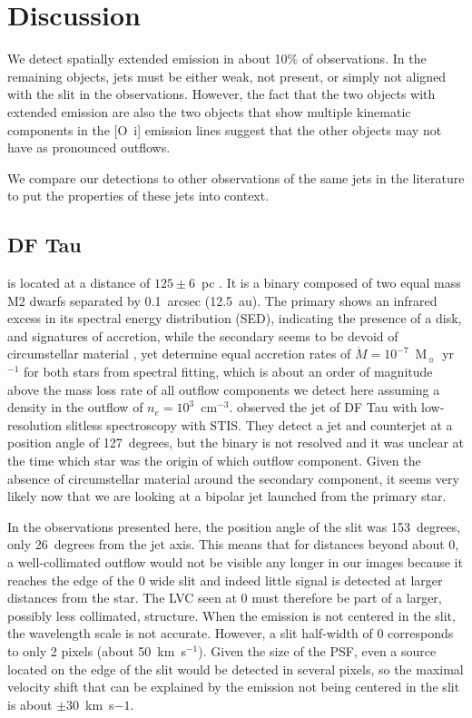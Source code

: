 \documentclass[twocolumn,trackchanges]{aastex62}
\begin{document}
\section{Discussion}
\label{sect:discussion}
We detect spatially extended emission in about 10\% of observations. In the
remaining objects, jets must be either weak, not present, or simply not aligned
with the slit in the observations. However, the fact that the two objects with
extended emission are also the two objects that show multiple kinematic
components in the [O~{\sc i}] emission lines \citep{2003ApJ...583..334H}
suggest that the other objects may not have as pronounced outflows.

We compare our detections to other observations of the same jets in the literature to put the properties of these jets into context.

\subsection{DF Tau}

 is located at a distance of $125\pm6$~pc
\citep{2016A&A...595A...1G,2018A&A...616A...1G}. It is a binary composed of two
equal mass M2 dwarfs separated by 0.1~arcsec (12.5~au). The primary shows an
infrared excess in its spectral energy distribution (SED), indicating the
presence of a disk, and signatures of accretion, while the secondary seems to
be devoid of circumstellar material \citep{2017ApJ...845..161A}, yet
\citet{2003ApJ...583..334H} determine equal accretion rates of $\dot
M=10^{-7}$~M$_{\sun}$~yr$^{-1}$ for both stars from spectral fitting, which is
about an order of magnitude above the mass loss rate of all outflow components
we detect here assuming a density in the outflow of $n_e=10^3$~cm$^{-3}$.
\citet{2004ApJ...609..261H} observed the jet of DF Tau with low-resolution slitless spectroscopy with STIS. They detect a jet and counterjet at a
position angle of 127~degrees, but the binary is not resolved and it was unclear at the time which star was the origin of which outflow component. Given the absence of circumstellar material around the secondary component, it seems very likely now that we are looking at a bipolar jet launched from the primary star. 

In the observations presented here, the position angle of the slit was 153~degrees, only 26~degrees from the jet axis. This means that for distances beyond about 0, a well-collimated outflow would not be visible any longer in our images because it reaches the edge of the 0 wide slit and indeed little signal is detected at larger distances from the star. The LVC seen at 0 must therefore be part of a larger, possibly less collimated, structure. When the emission is not centered in the slit, the wavelength scale is not accurate. However, a slit half-width of 0 corresponds to only 2 pixels (about 50~km~s$^{-1}$). Given the size of the PSF, even a source located on the edge of the slit would be detected in several pixels, so the maximal velocity shift that can be explained by the emission not being centered in the slit is about $\pm30$~km~s${-1}$.
\end{document}
